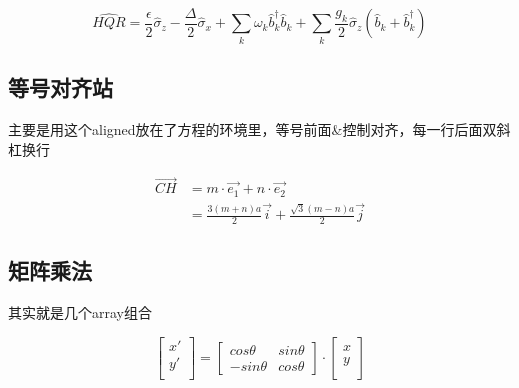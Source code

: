 \documentclass[AutoFakeBold]{LZUThesis}
\begin{document}
\begin{equation}
    \hat{HQR}=\frac{\epsilon}{2}\hat{\sigma}_{z}-\frac{\Delta}{2}\hat{\sigma}_{x}+\sum_{k}\omega_{k}\hat{b}_{k}^{\dagger}\hat{b}_{k}+\sum_{k}\frac{g_{k}}{2}\hat{\sigma}_{z}(\hat{b}_{k}+\hat{b}_{k}^{\dagger})\label{eq:sbm}
\end{equation}



\subsection{等号对齐站}
\label{sub:等号对齐站}

主要是用这个aligned放在了方程的环境里，等号前面\&控制对齐，每一行后面双斜杠换行

\begin{equation}
    \begin{aligned}
        \vec{CH} & = m\cdot \vec{e_1} + n\cdot \vec{e_2}                          \\
                 & = \frac{3(m+n)a}{2} \vec{i} + \frac{\sqrt{3}(m-n)a}{2} \vec{j}
    \end{aligned}
    \label{ch}
\end{equation}


\subsection{矩阵乘法}
\label{sub:矩阵乘法}

其实就是几个array组合

\begin{equation}
    \left[
        \begin{array}{c}
            x' \\
            y' \\
        \end{array}
        \right]=
    \left[
        \begin{array}{cc}
            cos \theta   & sin \theta \\
            - sin \theta & cos \theta
        \end{array}
        \right]
    \cdot
    \left[
        \begin{array}{c}
            x \\
            y \\
        \end{array}
        \right]
\end{equation}
\end{document}
